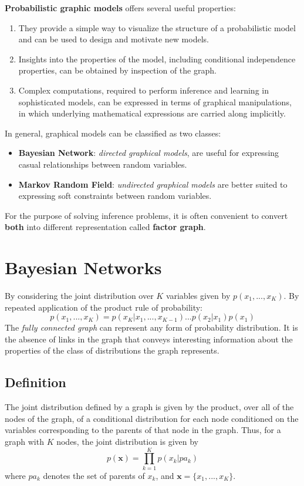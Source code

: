 \documentclass[a3paper, 12pt]{book} %
\begin{document}
\textbf{Probabilistic graphic models} offers several useful properties:
\begin{enumerate}
	\item They provide a simple way to visualize the structure of a probabilistic model and can be used to design and motivate new models.
	\item Insights into the properties of the model, including conditional independence properties, can be obtained by inspection of the graph.
	\item Complex computations, required to perform inference and learning in sophisticated models, can be expressed in terms of graphical manipulations, in which underlying mathematical expressions are carried along implicitly.
\end{enumerate} 
In general, graphical models can be classified as two classes:
\begin{itemize}
	\item \textbf{Bayesian Network}: \emph{directed graphical models}, are useful for expressing casual relationships between random variables.
	\item \textbf{Markov Random Field}: \emph{undirected graphical models} are better suited to expressing soft constraints between random variables.
\end{itemize}
For the purpose of solving inference problems, it is often convenient to convert \textbf{both} into different representation called \textbf{factor graph}.

\section{Bayesian Networks}
By considering the joint distribution over $K$ variables given by $p(x_1,...,x_K)$. By repeated application of the product rule of probability:
\begin{equation}
p(x_1,...,x_K)=p(x_K|x_1,...,x_{K-1})...p(x_2|x_1)p(x_1)
\end{equation}
The \emph{fully connected graph} can represent any form of probability distribution. It is the absence of links in the graph that conveys interesting information about the properties of the class of distributions the graph represents.

\subsection{Definition}
The joint distribution
defined by a graph is given by the product, over all of the nodes of the graph, of
a conditional distribution for each node conditioned on the variables corresponding
to the parents of that node in the graph. Thus, for a graph with $K$ nodes, the joint
distribution is given by 
\begin{equation}
p(\mathbf{x})=\prod_{k=1}^{K}{p(x_k|pa_k)}
\end{equation}
where $pa_k$ denotes the set of parents of $x_k$, and $\mathbf{x}=\{x_1,...,x_K\}$.
\end{document}
